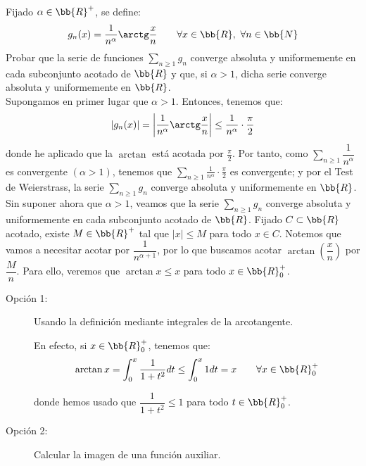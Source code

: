 \begin{ejercicio}
    Fijado $\alpha\in \bb{R}^+$, se define:
    \begin{equation*}
        g_n(x) = \frac{1}{n^\alpha} \arctg \frac{x}{n} \qquad \forall x\in\bb{R},~\forall n\in \bb{N}
    \end{equation*}
    Probar que la serie de funciones $\sum\limits_{n\geq 1}g_n$ converge absoluta y uniformemente en cada
    subconjunto acotado de $\bb{R}$ y que, si $\alpha > 1$, dicha serie converge absoluta y uniformemente en $\bb{R}$.\\

    Supongamos en primer lugar que $\alpha>1$. Entonces, tenemos que:
    \begin{equation*}
        \left|g_n(x)\right| = \left|\frac{1}{n^\alpha} \arctg \frac{x}{n}\right| \leq \frac{1}{n^\alpha}\cdot \frac{\pi}{2}
    \end{equation*}
    donde he aplicado que la $\arctan$ está acotada por $\frac{\pi}{2}$. Por tanto, como
    $\sum\limits_{n\geq 1}\dfrac{1}{n^\alpha}$ es convergente $(\alpha>1)$, tenemos que $\sum\limits_{n\geq 1}\frac{1}{n^\alpha} \cdot \frac{\pi}{2}$ es convergente;
    y por el Test de Weierstrass, la serie $\sum\limits_{n\geq 1}g_n$ converge absoluta y uniformemente en $\bb{R}$.\\

    Sin suponer ahora que $\alpha>1$, veamos que la serie $\sum\limits_{n\geq 1}g_n$ converge absoluta y uniformemente en cada
    subconjunto acotado de $\bb{R}$. Fijado $C\subset \bb{R}$ acotado, existe $M\in \bb{R}^+$ tal que $|x|\leq M$ para todo $x\in C$.
    Notemos que vamos a necesitar acotar por $\dfrac{1}{n^{\alpha+1}}$, por lo que buscamos acotar $\arctan\left(\dfrac{x}{n}\right)$ por $\dfrac{M}{n}$.
    Para ello, veremos que $\arctan x \leq x$ para todo $x\in \bb{R}^+_0$.
    \begin{description}
        \item[Opción 1:] Usando la definición mediante integrales de la arcotangente.
        
        En efecto, si $x\in \bb{R}^+_0$, tenemos que:
        \begin{equation*}
            \arctan x = \int_0^x \frac{1}{1+t^2}dt \leq \int_0^x 1dt = x \qquad \forall x\in \bb{R}^+_0
        \end{equation*}

        donde hemos usado que $\dfrac{1}{1+t^2}\leq 1$ para todo $t\in \bb{R}^+_0$.

        \item[Opción 2:] Calcular la imagen de una función auxiliar.
        

\end{description}
\end{ejercicio}
